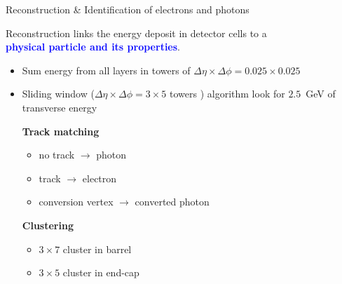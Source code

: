 \begin{frame}{Reconstruction \& Identification of electrons and photons}
  \begin{center}
    Reconstruction links the energy deposit in detector cells to a \\ \textcolor{blue}{\bf physical particle and its properties}.
    \begin{itemize}
      \item Sum energy from all layers in towers of $\Delta\eta\times\Delta\phi =0.025\times 0.025$
      \item Sliding window ($\Delta\eta\times\Delta\phi = 3 \times 5$ towers ) algorithm look for $2.5$~GeV of transverse energy
        \vfill
      \begin{minipage}[t]{0.49\linewidth}
        {\bf Track matching}
      \begin{itemize}
      \item no track $\rightarrow$ photon 
      \item track $\rightarrow$ electron
      \item conversion vertex $\rightarrow$ converted photon
      \end{itemize}
      \end{minipage}
      \hfill
      \begin{minipage}[t]{0.49\linewidth}
        {\bf Clustering}
        \begin{itemize}
        \item $3\times 7$ cluster  in barrel
        \item $3\times 5$ cluster  in end-cap
        \end{itemize}
      \end{minipage}
    \end{itemize}
  \end{center}
\end{frame}


